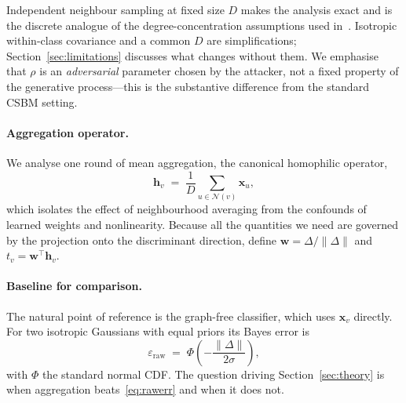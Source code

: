 \documentclass[../elsevier.tex]{subfiles}
\begin{document}
\begin{remark}
Independent neighbour sampling at fixed size $D$ makes the analysis exact and is
the discrete analogue of the degree-concentration assumptions used
in~\citep{baranwal2021graph}. Isotropic within-class covariance and a common $D$ are
simplifications; Section~\ref{sec:limitations} discusses what changes without them.
We emphasise that $\rho$ is an \emph{adversarial} parameter chosen by the attacker,
not a fixed property of the generative process---this is the substantive
difference from the standard CSBM setting.
\end{remark}

\paragraph{Aggregation operator.}
We analyse one round of mean aggregation, the canonical homophilic operator,
\begin{equation}
    \mathbf{h}_v \;=\; \frac{1}{D}\sum_{u \in \mathcal{N}(v)} \mathbf{x}_u ,
    \label{eq:meanagg}
\end{equation}
which isolates the effect of neighbourhood averaging from the confounds of learned
weights and nonlinearity. Because all the quantities we need are governed by the
projection onto the discriminant direction, define
$\mathbf{w} = \Delta/\|\Delta\|$ and $t_v = \mathbf{w}^\top \mathbf{h}_v$.

\paragraph{Baseline for comparison.}
The natural point of reference is the graph-free classifier, which uses
$\mathbf{x}_v$ directly. For two isotropic Gaussians with equal priors its Bayes
error is
\begin{equation}
    \varepsilon_{\mathrm{raw}} \;=\; \Phi\!\left(-\frac{\|\Delta\|}{2\sigma}\right),
    \label{eq:rawerr}
\end{equation}
with $\Phi$ the standard normal CDF. The question driving Section~\ref{sec:theory}
is when aggregation beats~\eqref{eq:rawerr} and when it does not.
\end{document}
